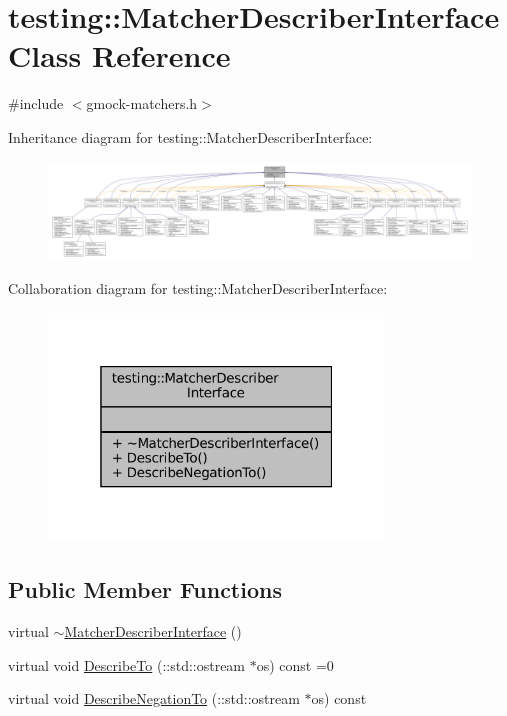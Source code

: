 \hypertarget{classtesting_1_1MatcherDescriberInterface}{}\section{testing\+:\+:Matcher\+Describer\+Interface Class Reference}
\label{classtesting_1_1MatcherDescriberInterface}


{\ttfamily \#include $<$gmock-\/matchers.\+h$>$}



Inheritance diagram for testing\+:\+:Matcher\+Describer\+Interface\+:
\nopagebreak
\begin{figure}[H]
\begin{center}
\leavevmode
\includegraphics[width=350pt]{classtesting_1_1MatcherDescriberInterface__inherit__graph}
\end{center}
\end{figure}


Collaboration diagram for testing\+:\+:Matcher\+Describer\+Interface\+:
\nopagebreak
\begin{figure}[H]
\begin{center}
\leavevmode
\includegraphics[width=253pt]{classtesting_1_1MatcherDescriberInterface__coll__graph}
\end{center}
\end{figure}
\subsection*{Public Member Functions}
\begin{DoxyCompactItemize}
\item 
virtual \hyperlink{classtesting_1_1MatcherDescriberInterface_ae2236a56ad2cc35cad10efc1208854f4}{$\sim$\+Matcher\+Describer\+Interface} ()
\item 
virtual void \hyperlink{classtesting_1_1MatcherDescriberInterface_ad9f861588bd969b6e3e717f13bb94e7b}{Describe\+To} (\+::std\+::ostream $\ast$os) const =0
\item 
virtual void \hyperlink{classtesting_1_1MatcherDescriberInterface_a2071afbc47097c4d1c0064275af34db0}{Describe\+Negation\+To} (\+::std\+::ostream $\ast$os) const
\end{DoxyCompactItemize}


